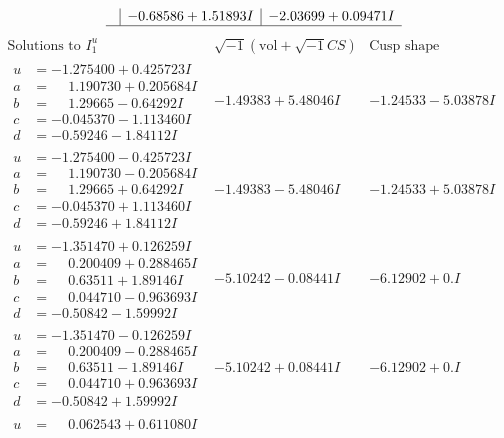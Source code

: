 \documentclass[1p]{elsarticle_modified}
\theoremstyle{definition}
\newcommand{\I}{\sqrt{-1}}
\begin{document}
$$\begin{array}{c|c|c}
 & -0.68586 + 1.51893 I & -2.03699 + 0.09471 I\\
 \hline 
 \end{array}$$\newpage$$\begin{array}{c|c|c}  
\text{Solutions to }I^u_{1}& \I (\text{vol} + \sqrt{-1}CS) & \text{Cusp shape}\\
 \hline 
\begin{aligned}
u &= -1.275400 + 0.425723 I \\
a &= \phantom{-}1.190730 + 0.205684 I \\
b &= \phantom{-}1.29665 - 0.64292 I \\
c &= -0.045370 - 1.113460 I \\
d &= -0.59246 - 1.84112 I\end{aligned}
 & -1.49383 + 5.48046 I & -1.24533 - 5.03878 I \\ \hline\begin{aligned}
u &= -1.275400 - 0.425723 I \\
a &= \phantom{-}1.190730 - 0.205684 I \\
b &= \phantom{-}1.29665 + 0.64292 I \\
c &= -0.045370 + 1.113460 I \\
d &= -0.59246 + 1.84112 I\end{aligned}
 & -1.49383 - 5.48046 I & -1.24533 + 5.03878 I \\ \hline\begin{aligned}
u &= -1.351470 + 0.126259 I \\
a &= \phantom{-}0.200409 + 0.288465 I \\
b &= \phantom{-}0.63511 + 1.89146 I \\
c &= \phantom{-}0.044710 - 0.963693 I \\
d &= -0.50842 - 1.59992 I\end{aligned}
 & -5.10242 - 0.08441 I & -6.12902 + 0. I\phantom{ +0.000000I} \\ \hline\begin{aligned}
u &= -1.351470 - 0.126259 I \\
a &= \phantom{-}0.200409 - 0.288465 I \\
b &= \phantom{-}0.63511 - 1.89146 I \\
c &= \phantom{-}0.044710 + 0.963693 I \\
d &= -0.50842 + 1.59992 I\end{aligned}
 & -5.10242 + 0.08441 I & -6.12902 + 0. I\phantom{ +0.000000I} \\ \hline\begin{aligned}
u &= \phantom{-}0.062543 + 0.611080 I \\

\end{aligned}
\end{array}$$
\end{document}
